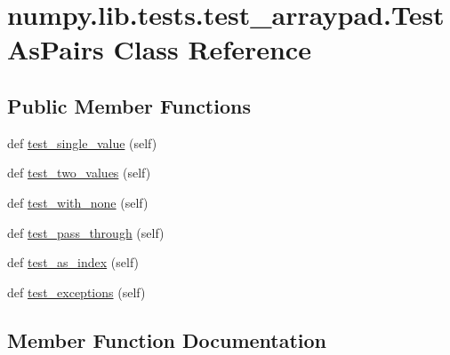 \hypertarget{classnumpy_1_1lib_1_1tests_1_1test__arraypad_1_1TestAsPairs}{}\section{numpy.\+lib.\+tests.\+test\+\_\+arraypad.\+Test\+As\+Pairs Class Reference}
\label{classnumpy_1_1lib_1_1tests_1_1test__arraypad_1_1TestAsPairs}
\subsection*{Public Member Functions}
\begin{DoxyCompactItemize}
\item 
def \hyperlink{classnumpy_1_1lib_1_1tests_1_1test__arraypad_1_1TestAsPairs_ac282d70bb5d06794430eb9bcda068460}{test\+\_\+single\+\_\+value} (self)
\item 
def \hyperlink{classnumpy_1_1lib_1_1tests_1_1test__arraypad_1_1TestAsPairs_ac8b1bb1bbd07f952af50d75a3d855e5e}{test\+\_\+two\+\_\+values} (self)
\item 
def \hyperlink{classnumpy_1_1lib_1_1tests_1_1test__arraypad_1_1TestAsPairs_aeb18b139b0a4731c251b34729fcf5e19}{test\+\_\+with\+\_\+none} (self)
\item 
def \hyperlink{classnumpy_1_1lib_1_1tests_1_1test__arraypad_1_1TestAsPairs_a24dad188e8c879da66b2b34d7841559a}{test\+\_\+pass\+\_\+through} (self)
\item 
def \hyperlink{classnumpy_1_1lib_1_1tests_1_1test__arraypad_1_1TestAsPairs_a19a9409a1c6dc07af6f897f42ca16cdf}{test\+\_\+as\+\_\+index} (self)
\item 
def \hyperlink{classnumpy_1_1lib_1_1tests_1_1test__arraypad_1_1TestAsPairs_ac5321c51ada782570b927f6111c2b094}{test\+\_\+exceptions} (self)
\end{DoxyCompactItemize}


\subsection{Member Function Documentation}
\mbox{\label{classnumpy_1_1lib_1_1tests_1_1test__arraypad_1_1TestAsPairs_a19a9409a1c6dc07af6f897f42ca16cdf}} 
